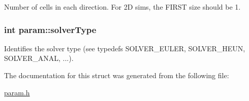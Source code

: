 Number of cells in each direction. For 2D sims, the FIRST size should be 1. 

\hypertarget{structparam_af6bc102637a024c481ffe84088917c31}{
\subsubsection[{solverType}]{\setlength{\rightskip}{0pt plus 5cm}int {\bf param::solverType}}}
\label{structparam_af6bc102637a024c481ffe84088917c31}


Identifies the solver type (see typedefs SOLVER\_\-EULER, SOLVER\_\-HEUN, SOLVER\_\-ANAL, ...). 



The documentation for this struct was generated from the following file:\begin{DoxyCompactItemize}
\item 
\hyperlink{param_8h}{param.h}\end{DoxyCompactItemize}
